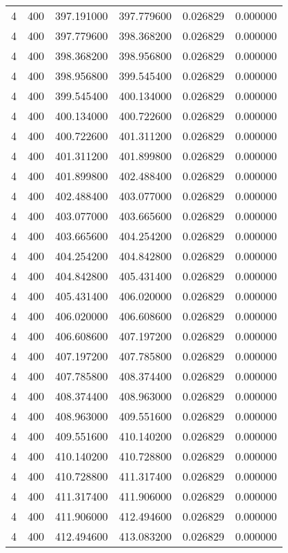 \begin{longtable}{rrrrrr}
4 & 400 & 397.191000 & 397.779600 & 0.026829 & 0.000000 \\
4 & 400 & 397.779600 & 398.368200 & 0.026829 & 0.000000 \\
4 & 400 & 398.368200 & 398.956800 & 0.026829 & 0.000000 \\
4 & 400 & 398.956800 & 399.545400 & 0.026829 & 0.000000 \\
4 & 400 & 399.545400 & 400.134000 & 0.026829 & 0.000000 \\
4 & 400 & 400.134000 & 400.722600 & 0.026829 & 0.000000 \\
4 & 400 & 400.722600 & 401.311200 & 0.026829 & 0.000000 \\
4 & 400 & 401.311200 & 401.899800 & 0.026829 & 0.000000 \\
4 & 400 & 401.899800 & 402.488400 & 0.026829 & 0.000000 \\
4 & 400 & 402.488400 & 403.077000 & 0.026829 & 0.000000 \\
4 & 400 & 403.077000 & 403.665600 & 0.026829 & 0.000000 \\
4 & 400 & 403.665600 & 404.254200 & 0.026829 & 0.000000 \\
4 & 400 & 404.254200 & 404.842800 & 0.026829 & 0.000000 \\
4 & 400 & 404.842800 & 405.431400 & 0.026829 & 0.000000 \\
4 & 400 & 405.431400 & 406.020000 & 0.026829 & 0.000000 \\
4 & 400 & 406.020000 & 406.608600 & 0.026829 & 0.000000 \\
4 & 400 & 406.608600 & 407.197200 & 0.026829 & 0.000000 \\
4 & 400 & 407.197200 & 407.785800 & 0.026829 & 0.000000 \\
4 & 400 & 407.785800 & 408.374400 & 0.026829 & 0.000000 \\
4 & 400 & 408.374400 & 408.963000 & 0.026829 & 0.000000 \\
4 & 400 & 408.963000 & 409.551600 & 0.026829 & 0.000000 \\
4 & 400 & 409.551600 & 410.140200 & 0.026829 & 0.000000 \\
4 & 400 & 410.140200 & 410.728800 & 0.026829 & 0.000000 \\
4 & 400 & 410.728800 & 411.317400 & 0.026829 & 0.000000 \\
4 & 400 & 411.317400 & 411.906000 & 0.026829 & 0.000000 \\
4 & 400 & 411.906000 & 412.494600 & 0.026829 & 0.000000 \\
4 & 400 & 412.494600 & 413.083200 & 0.026829 & 0.000000 \\

\end{longtable}
